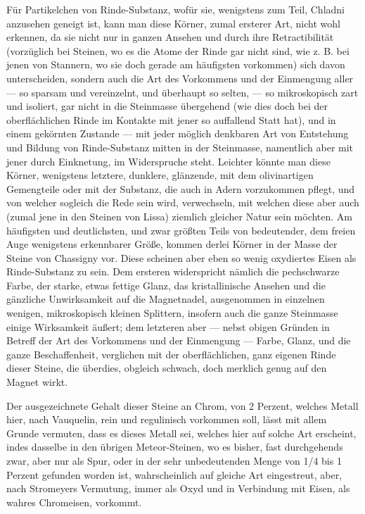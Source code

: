 \documentclass[a4paper, 11pt, oneside, german]{article}
\begin{document}
Für Partikelchen von Rinde-Substanz, wofür sie, wenigstens zum Teil, Chladni anzusehen geneigt ist, kann man diese Körner, zumal ersterer Art, nicht wohl erkennen, da sie nicht nur in ganzen Ansehen und durch ihre Retractibilität (vorzüglich bei Steinen, wo es die Atome der Rinde gar nicht sind, wie z. B. bei jenen von Stannern, wo sie doch gerade am häufigsten vorkommen) sich davon unterscheiden, sondern auch die Art des Vorkommens und der Einmengung aller --- so sparsam und vereinzelnt, und überhaupt so selten, --- so mikroskopisch zart und isoliert, gar nicht in die Steinmasse übergehend (wie dies doch bei der oberflächlichen Rinde im Kontakte mit jener so auffallend Statt hat), und in einem gekörnten Zustande --- mit jeder möglich denkbaren Art von Entstehung und Bildung von Rinde-Substanz mitten in der Steinmasse, namentlich aber mit jener durch Einknetung, im Widerspruche steht. Leichter könnte man diese Körner, wenigstens letztere, dunklere, glänzende, mit dem olivinartigen Gemengteile oder mit der Substanz, die auch in Adern vorzukommen pflegt, und von welcher sogleich die Rede sein wird, verwechseln, mit welchen diese aber auch (zumal jene in den Steinen von Lissa) ziemlich gleicher Natur sein möchten. Am häufigsten und deutlichsten, und zwar größten Teils von bedeutender, dem freien Auge wenigstens erkennbarer Größe, kommen derlei Körner in der Masse der Steine von Chassigny vor. Diese scheinen aber eben so wenig oxydiertes Eisen als Rinde-Substanz zu sein. Dem ersteren widerspricht nämlich die pechschwarze Farbe, der starke, etwas fettige Glanz, das kristallinische Ansehen und die gänzliche Unwirksamkeit auf die Magnetnadel, ausgenommen in einzelnen wenigen, mikroskopisch kleinen Splittern, insofern auch die ganze Steinmasse einige Wirksamkeit äußert; dem letzteren aber --- nebst obigen Gründen in Betreff der Art des Vorkommens und der Einmengung --- Farbe, Glanz, und die ganze Beschaffenheit, verglichen mit der oberflächlichen, ganz eigenen Rinde dieser Steine, die überdies, obgleich schwach, doch merklich genug auf den Magnet wirkt.

Der ausgezeichnete Gehalt dieser Steine an Chrom, von 2 Perzent, welches Metall hier, nach Vauquelin, rein und regulinisch vorkommen soll, lässt mit allem Grunde vermuten, dass es dieses Metall sei, welches hier auf solche Art erscheint, indes dasselbe in den übrigen Meteor-Steinen, wo es bisher, fast durchgehends zwar, aber nur als Spur, oder in der sehr unbedeutenden Menge von 1/4 bis 1 Perzent gefunden worden ist, wahrscheinlich auf gleiche Art eingestreut, aber, nach Stromeyers Vermutung, immer als Oxyd und in Verbindung mit Eisen, als wahres Chromeisen, vorkommt.
\end{document}
